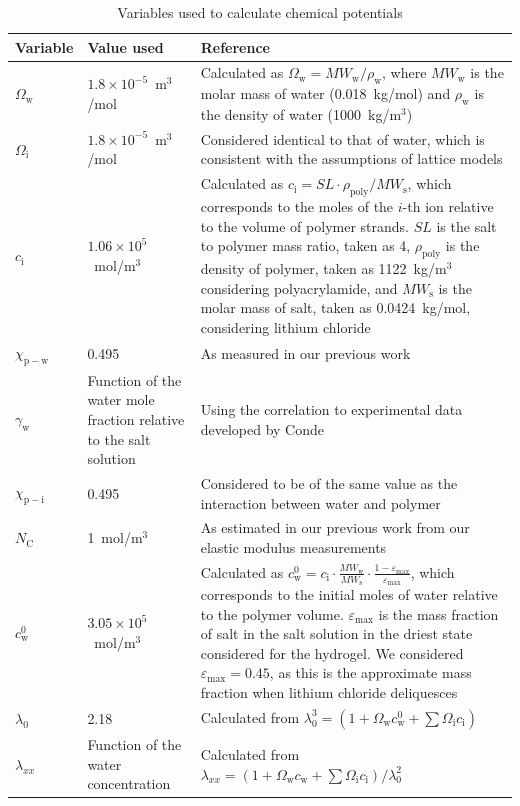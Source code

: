 \documentclass[11pt]{article}
\begin{document}
\begin{table}[htbp]
\centering
\caption{Variables used to calculate chemical potentials}
\label{tab:S1}
\small
\begin{tabular}{@{}p{1.8cm}p{3.3cm}p{9.5cm}@{}}
\toprule
Variable & Value used & Reference \\
\midrule
$\Omega_\mathrm{w}$ & $1.8\times10^{-5}$~m$^3$/mol & Calculated as $\Omega_\mathrm{w} = MW_\mathrm{w}/\rho_\mathrm{w}$, where $MW_\mathrm{w}$ is the molar mass of water (0.018~kg/mol) and $\rho_\mathrm{w}$ is the density of water (1000~kg/m$^3$) \\
$\Omega_\mathrm{i}$ & $1.8\times10^{-5}$~m$^3$/mol & Considered identical to that of water, which is consistent with the assumptions of lattice models\cite{flory1953} \\
$c_\mathrm{i}$ & $1.06\times10^{5}$~mol/m$^3$ & Calculated as $c_\mathrm{i} = SL\cdot \rho_\mathrm{poly}/MW_\mathrm{s}$, which corresponds to the moles of the $i$-th ion relative to the volume of polymer strands. $SL$ is the salt to polymer mass ratio, taken as 4, $\rho_\mathrm{poly}$ is the density of polymer, taken as 1122~kg/m$^3$ considering polyacrylamide, and $MW_\mathrm{s}$ is the molar mass of salt, taken as 0.0424~kg/mol, considering lithium chloride \\
$\chi_\mathrm{p-w}$ & 0.495 & As measured in our previous work\cite{graeber2023} \\
$\gamma_\mathrm{w}$ & Function of the water mole fraction relative to the salt solution & Using the correlation to experimental data developed by Conde\cite{conde2004} \\
$\chi_\mathrm{p-i}$ & 0.495 & Considered to be of the same value as the interaction between water and polymer\cite{chen2022} \\
$N_\mathrm{C}$ & 1~mol/m$^3$ & As estimated in our previous work from our elastic modulus measurements\cite{graeber2023} \\
$c_\mathrm{w}^0$ & $3.05\times10^{5}$~mol/m$^3$ & Calculated as $c_\mathrm{w}^0 = c_\mathrm{i}\cdot \frac{MW_\mathrm{w}}{MW_\mathrm{s}}\cdot \frac{1-\varepsilon_\mathrm{max}}{\varepsilon_\mathrm{max}}$, which corresponds to the initial moles of water relative to the polymer volume. $\varepsilon_\mathrm{max}$ is the mass fraction of salt in the salt solution in the driest state considered for the hydrogel. We considered $\varepsilon_\mathrm{max}=0.45$, as this is the approximate mass fraction when lithium chloride deliquesces\cite{conde2004} \\
$\lambda_0$ & 2.18 & Calculated from $\lambda_0^3 = (1 + \Omega_\mathrm{w} c_\mathrm{w}^0 + \sum \Omega_\mathrm{i} c_\mathrm{i})$ \\
$\lambda_{xx}$ & Function of the water concentration & Calculated from $\lambda_{xx} = (1 + \Omega_\mathrm{w} c_\mathrm{w} + \sum \Omega_\mathrm{i} c_\mathrm{i})/\lambda_0^2$ \\
\bottomrule
\end{tabular}
\end{table}
\end{document}
